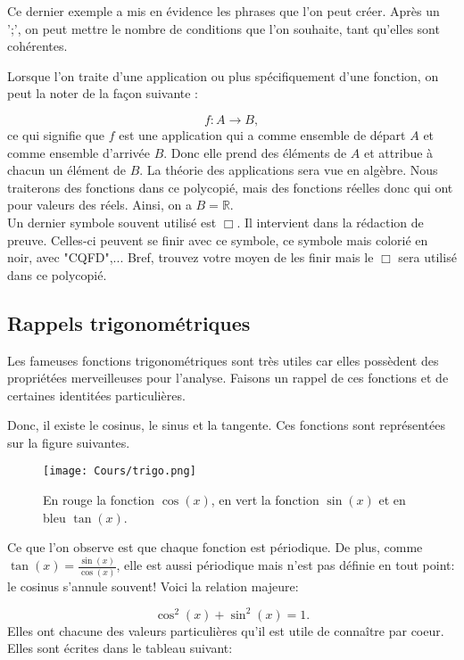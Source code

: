 \documentclass[a4paper, 12pt, french, twoside]{article}
\newcommand{\Rr}{{\mathbb{R}}}
\begin{document}
Ce dernier exemple a mis en évidence les phrases que l'on peut créer. Après un ';', on peut mettre le nombre de conditions que l'on souhaite, tant qu'elles sont cohérentes. 

Lorsque l'on traite d'une application ou plus spécifiquement d'une fonction, on peut la noter de la façon suivante :

\begin{equation}
    f: A \to B,
\end{equation}
ce qui signifie que $f$ est une application qui a comme ensemble de départ $A$ et comme ensemble d'arrivée $B$. Donc elle prend des éléments de $A$ et attribue à chacun un élément de $B$. La théorie des applications sera vue en algèbre. Nous traiterons des fonctions dans ce polycopié, mais des fonctions réelles donc qui ont pour valeurs des réels. Ainsi, on a $B=\Rr$.\\

Un dernier symbole souvent utilisé est $\Box$. Il intervient dans la rédaction de preuve. Celles-ci peuvent se finir avec ce symbole, ce symbole mais colorié en noir, avec "CQFD",... Bref, trouvez votre moyen de les finir mais le $\Box$ sera utilisé dans ce polycopié.

\subsection{Rappels trigonométriques}

Les fameuses fonctions trigonométriques sont très utiles car elles possèdent des propriétées merveilleuses pour l'analyse. Faisons un rappel de ces fonctions et de certaines identitées particulières. 

Donc, il existe le cosinus, le sinus et la tangente. Ces fonctions sont représentées sur la figure suivantes.

\begin{figure}[H]
    \centering
    \texttt{[image: Cours/trigo.png]}
    \caption{En rouge la fonction $\cos(x)$, en vert la fonction $\sin(x)$ et en bleu $\tan(x)$.}
    \label{fig:enter-label}
\end{figure}
Ce que l'on observe est que chaque fonction est périodique. De plus, comme $\tan(x)=\frac{\sin(x)}{\cos(x)}$, elle est aussi périodique mais n'est pas définie en tout point: le cosinus s'annule souvent!
Voici la relation majeure:

\begin{equation}
    \cos^2(x)+\sin^2(x)=1.
\end{equation}
Elles ont chacune des valeurs particulières qu'il est utile de connaître par coeur. Elles sont écrites dans le tableau suivant:
\end{document}
